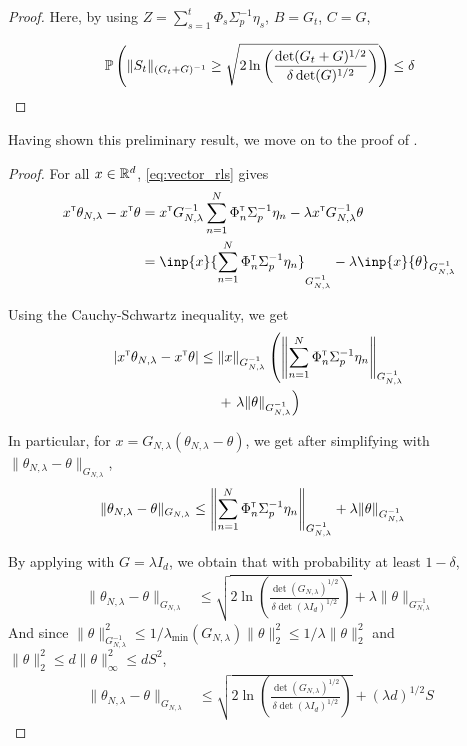 \begin{subappendices}
\begin{proof}
		Here, by using $Z = \sum_{s=1}^t\Phi_s\Sigma_p^{-1}\eta_s$, $B=G_t$, $C=G$,
		
		\[
		\mathbb{P}\left(\| S_t \|_{(G_t+G)^{-1}} \geq \sqrt{2\ln \left(\frac{\det(G_t+G)^{1/2}}{\delta\det(G)^{1/2}}\right)}\right) \leq \delta
		\]
		
	\end{proof}
	
	Having shown this preliminary result, we move on to the proof of .
	
	\begin{proof}
		For all $x\in\mathbb{R}^d$, \eqref{eq:vector_rls} gives
		\begin{align*}
		x^\transp\theta_{N,\lambda}  -x^\transp\theta &= x^\transp G_{N, \lambda}^{-1}\sum_{n=1}^N \Phi_n^\transp \Sigma_p^{-1}\eta_n
		- \lambda x^\transp G_{N, \lambda}^{-1}\theta\\
		&= \inp{x}{\sum_{n=1}^N \Phi_n^\transp \Sigma_p^{-1}\eta_n}_{G_{N, \lambda}^{-1}} - \lambda\inp{x}{\theta}_{G_{N, \lambda}^{-1}}
		\end{align*}
		
		Using the Cauchy-Schwartz inequality, we get
		\begin{align*}
		|x^{\mathsf{\scriptscriptstyle T}}\theta_{N,\lambda}  -x^{\mathsf{\scriptscriptstyle T}}\theta| \leq {} & \|x\|_{G_{N, \lambda}^{-1}}\left(\left\|\sum_{n=1}^N \Phi_n^{\mathsf{\scriptscriptstyle T}} \Sigma_p^{-1}\eta_n\right\|_{G_{N, \lambda}^{-1}}\right.\\ 
		&+ \left.\lambda\|\theta\|_{G_{N, \lambda}^{-1}}\right)
		\end{align*}
		
		In particular, for $x = G_{N,\lambda}(\theta_{N,\lambda} - \theta)$, we get after simplifying with $\| \theta_{N,\lambda}  - \theta\|_{G_{N,\lambda}}$,
		\begin{align*}
		\| \theta_{N,\lambda}  - \theta\|_{G_{N,\lambda}} &\leq \left\|\sum_{n=1}^N \Phi_n^{\mathsf{\scriptscriptstyle T}} \Sigma_p^{-1}\eta_n\right\|_{G_{N, \lambda}^{-1}} + \lambda\|\theta\|_{G_{N, \lambda}^{-1}}
		\end{align*}
		
		By applying  with $G=\lambda I_d$, we obtain that with probability at least $1-\delta$,
		\begin{align*}
		\| \theta_{N,\lambda}  - \theta\|_{G_{N,\lambda}} &\leq \sqrt{2\ln \left(\frac{\det(G_{N,\lambda})^{1/2}}{\delta\det(\lambda I_d)^{1/2}}\right)}
		+ \lambda\|\theta\|_{G_{N, \lambda}^{-1}}
		\end{align*}
		And since $\|\theta\|_{G_{N, \lambda}^{-1}}^2 \leq 1/\lambda_{\min}(G_{N,\lambda})\|\theta\|_2^2 \leq 1/\lambda \|\theta\|_2^2$ and $\|\theta\|_2^2 \leq d\|\theta\|_\infty^2\leq d S^2$,
		\begin{align*}
		\| \theta_{N,\lambda}  - \theta\|_{G_{N,\lambda}} &\leq \sqrt{2\ln \left(\frac{\det(G_{N,\lambda})^{1/2}}{\delta\det(\lambda I_d)^{1/2}}\right)}
		+ (\lambda d)^{1/2}S
		\end{align*}
	\end{proof}
	

\end{subappendices}
